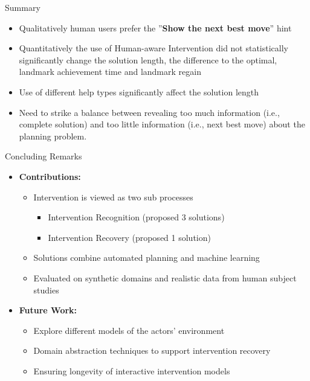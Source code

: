 \begin{frame}{Summary}
\begin{itemize}
\item Qualitatively human users prefer the ''\textbf{Show the next best move}'' hint
\item Quantitatively the use of Human-aware Intervention did not statistically significantly change the solution length, the difference to the optimal,  landmark achievement time and landmark regain
\item Use of different help types significantly affect the solution length
\item Need to strike a balance between revealing too much information   (i.e., complete solution) and too little information (i.e., next best move) about the planning problem.
\end{itemize}

\end{frame}

\begin{frame}{Concluding Remarks}
\begin{itemize}
\item \textbf{Contributions:}
\begin{itemize}
\item Intervention is viewed as two sub processes
\begin{itemize}
\item Intervention Recognition (proposed 3 solutions)
\item Intervention Recovery (proposed 1 solution)
\end{itemize}
\item Solutions combine automated planning and machine learning
\item Evaluated on synthetic domains and realistic data from human subject studies
\end{itemize}

\item \textbf{Future Work:}
\begin{itemize}
\item Explore different models of the actors' environment
\item Domain abstraction techniques to support intervention recovery
\item Ensuring longevity of interactive intervention models
\end{itemize}
\end{itemize}
\end{frame}